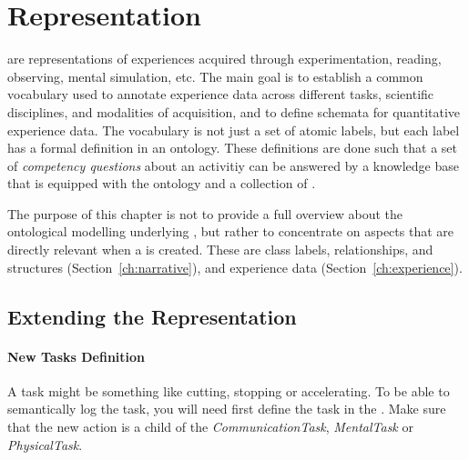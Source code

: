 \chapter{Representation}
\label{chap:represenation}

\neems are representations of experiences acquired through experimentation, reading, observing, mental simulation, etc.
The main goal is to establish a common vocabulary used to annotate experience data across different tasks, scientific disciplines, and modalities of acquisition, and to define schemata for quantitative experience data.
The vocabulary is not just a set of atomic labels, but each label has a formal definition in an ontology.
These definitions are done such that a set of \emph{competency questions} about an activitiy can be answered by a knowledge base that is equipped with the ontology and a collection of \neems.

The purpose of this chapter is not to provide a full overview about the ontological modelling underlying \neems, but rather to concentrate on aspects that are directly relevant when a \neem is created.
These are class labels, relationships, and structures (Section~\ref{ch:narrative}), and experience data (Section~\ref{ch:experience}).





\section{Extending the Representation}
\label{sec:extension}
\subsubsection{New Tasks Definition}
\label{sec:extension,subsec:task}
A task might be something like cutting, stopping or accelerating.
To be able to semantically log the task, you will need first define the task in the \easeAct.
Make sure that the new action is a child of the \textit{CommunicationTask}, \textit{MentalTask} or \textit{PhysicalTask}.
